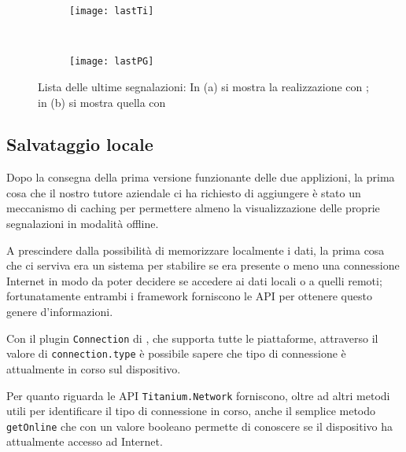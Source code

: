        \begin{figure}[h]
            \centering
            \begin{subfigure}[b]{0.485\textwidth}
                \texttt{[image: lastTi]}
                \caption{}
                \label{fig:tiLast}
            \end{subfigure}
            ~
            \begin{subfigure}[b]{0.485\textwidth}
                \texttt{[image: lastPG]}
                \caption{}
                \label{fig:kendoLast}
            \end{subfigure}
            \caption{Lista delle ultime segnalazioni:
            In (a) si mostra la realizzazione con \tisdk{}; in (b) si mostra
            quella con \kendomob{}
            }
            \label{fig:last}
        \end{figure}


        \subsection{Salvataggio locale}
        \label{subsec:caching}
            Dopo la consegna della prima versione funzionante delle due
            applizioni, la prima cosa che il nostro tutore aziendale ci ha
            richiesto di aggiungere è stato un meccanismo di caching per
            permettere almeno la visualizzazione delle proprie segnalazioni in
            modalità offline.

            A prescindere dalla possibilità di memorizzare localmente i dati,
            la prima cosa che ci serviva era un sistema per stabilire se era
            presente o meno una connessione Internet in modo da poter
            decidere se accedere ai dati locali o a quelli remoti;
            fortunatamente entrambi i framework forniscono le API per ottenere
            questo genere d'informazioni.

            Con il plugin \texttt{Connection} di \pg{}, che supporta tutte le
            piattaforme, attraverso il valore di \texttt{connection.type} è
            possibile sapere che tipo di connessione è attualmente in corso
            sul dispositivo.

            Per quanto riguarda \tisdk{} le API \texttt{Titanium.Network}
            forniscono, oltre ad altri metodi utili per identificare il tipo di
            connessione in corso, anche il semplice metodo \texttt{getOnline}
            che con un valore booleano permette di conoscere se il dispositivo
            ha attualmente accesso ad Internet.

